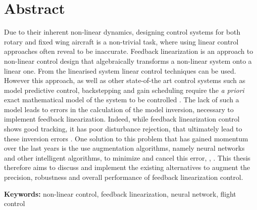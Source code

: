 
\section*{Abstract}


Due to their inherent non-linear dynamics, designing control systems for both rotary and fixed wing aircraft is a non-trivial task, where using linear control approaches often reveal to be inaccurate. Feedback linearization is an approach to non-linear control design that algebraically transforms a non-linear system onto a linear one. From the linearised system linear control techniques can be used. However this approach, as well as other state-of-the art control systems such as model predictive control, backstepping and gain scheduling require the \textit{a priori} exact mathematical model of the system to be controlled \cite{SotA_IFCS}. The lack of such a model leads to errors in the calculation of the model inversion, necessary to implement feedback linearization. Indeed, while feedback linearization control shows good tracking, it has poor disturbance rejection, that ultimately lead to these inversion errors \cite{SotA_ControlAlgorithm}. One solution to this problem that has gained momentum over the last years is the use augmentation algorithms, namely neural networks and other intelligent algorithms, to minimize and cancel this error\cite{NLI+NN}, \cite{NLI+NN_IFCS}, \cite{NLI+NN_chinese}. This thesis therefore aims to discuss and implement the existing alternatives to augment the precision, robustness and overall performance of feedback linearization control.

\vfill

\textbf{\Large Keywords:} non-linear control, feedback linearization, neural network, flight control

